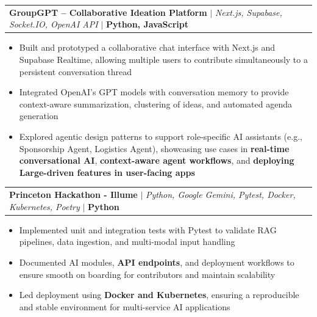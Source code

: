 \documentclass[letterpaper,10pt]{article}
\makeatletter
\newcommand{\resumeItem}[1]{
  \item\small{
    {#1 \vspace{-3pt}}
  }
}
\newcommand{\resumeProjectHeading}[2]{
    \item
    \begin{tabular*}{0.97\textwidth}{l@{\extracolsep{\fill}}r}
      \small#1 & #2 \\
    \end{tabular*}\vspace{-9pt}
}
\newcommand{\resumeItemListStart}{\begin{itemize}}
\newcommand{\resumeItemListEnd}{\end{itemize}\vspace{-7pt}}
\makeatother
\begin{document}
    \vspace{20pt}

    \resumeProjectHeading
    {\textbf{GroupGPT – Collaborative Ideation Platform} $|$ \emph{Next.js, Supabase, Socket.IO, OpenAI API} $|$ \textbf{Python, JavaScript}}{}
  \resumeItemListStart
  \vspace{10pt}
    \resumeItem{Built and prototyped a collaborative chat interface with Next.js and Supabase Realtime, allowing multiple users to contribute simultaneously to a persistent conversation thread}
    \vspace{5pt}
    \resumeItem{Integrated OpenAI’s GPT models with conversation memory to provide context-aware summarization, clustering of ideas, and automated agenda generation}
    \vspace{5pt}
    \resumeItem{Explored agentic design patterns to support role-specific AI assistants (e.g., Sponsorship Agent, Logistics Agent), showcasing use cases in \textbf{real-time conversational AI}, \textbf{context-aware agent workflows}, and \textbf{deploying Large-driven features in user-facing apps}}
  \resumeItemListEnd

  \vspace{20pt}

        \resumeProjectHeading
        {\textbf{Princeton Hackathon - Illume} $|$ \emph{Python, Google Gemini, Pytest, Docker, Kubernetes, Poetry } $|$ \textbf{Python}}{}
          \resumeItemListStart
          \vspace{5pt}
           \resumeItem{Implemented unit and integration tests with Pytest to validate RAG pipelines, data ingestion, and multi-modal input handling}
           \vspace{5pt}
           \resumeItem{Documented AI modules, \textbf{API endpoints}, and deployment workflows to ensure smooth on boarding for contributors and maintain scalability}
           \vspace{5pt}
           \resumeItem{Led deployment using \textbf{Docker and Kubernetes}, ensuring a reproducible and stable environment for multi-service AI applications}
          \resumeItemListEnd
\end{document}
